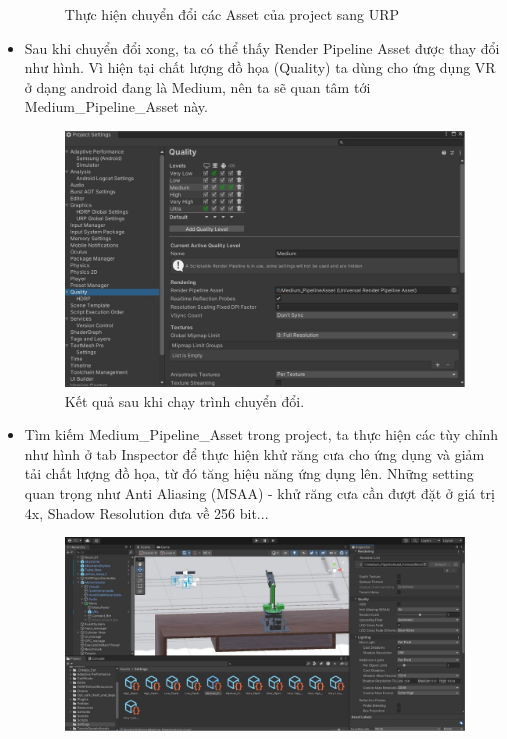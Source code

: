\begin{itemize}
\begin{figure}[H]
        \caption{Thực hiện chuyển đổi các Asset của project sang URP}
        \label{fig:unityrp_1}
    \end{figure}
    \item Sau khi chuyển đổi xong, ta có thể thấy Render Pipeline Asset được thay đổi như hình. Vì hiện tại chất lượng đồ họa (Quality) ta dùng cho ứng dụng VR ở dạng android đang là Medium, nên ta sẽ quan tâm tới Medium\_Pipeline\_Asset này.
    \begin{figure}[H]
        \centering
        \includegraphics[width=1\textwidth]{Images/Implementation/VRapp/unityrp_2.jpg}
        \caption{Kết quả sau khi chạy trình chuyển đổi.}
        \label{fig:unityrp_2}
    \end{figure}
    \item Tìm kiếm Medium\_Pipeline\_Asset trong project, ta thực hiện các tùy chỉnh như hình ở tab Inspector để thực hiện khử răng cưa cho ứng dụng và giảm tải chất lượng đồ họa, từ đó tăng hiệu năng ứng dụng lên. Những setting quan trọng như Anti Aliasing (MSAA) - khử răng cưa cần đượt đặt ở giá trị 4x, Shadow Resolution đưa về 256 bit...
    \begin{figure}[H]
        \centering
        \includegraphics[width=1\textwidth]{Images/Implementation/VRapp/unityrp_3}

\end{figure}
\end{itemize}

